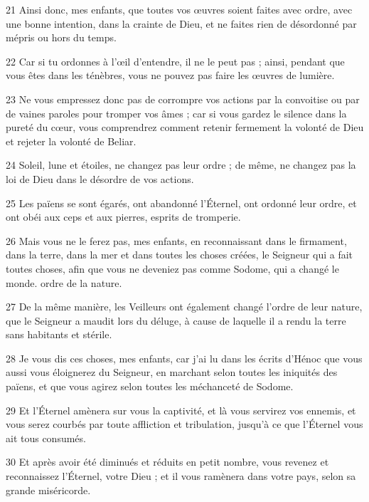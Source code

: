 \par 21 Ainsi donc, mes enfants, que toutes vos œuvres soient faites avec ordre, avec une bonne intention, dans la crainte de Dieu, et ne faites rien de désordonné par mépris ou hors du temps.

\par 22 Car si tu ordonnes à l'œil d'entendre, il ne le peut pas ; ainsi, pendant que vous êtes dans les ténèbres, vous ne pouvez pas faire les œuvres de lumière.

\par 23 Ne vous empressez donc pas de corrompre vos actions par la convoitise ou par de vaines paroles pour tromper vos âmes ; car si vous gardez le silence dans la pureté du cœur, vous comprendrez comment retenir fermement la volonté de Dieu et rejeter la volonté de Beliar.

\par 24 Soleil, lune et étoiles, ne changez pas leur ordre ; de même, ne changez pas la loi de Dieu dans le désordre de vos actions.

\par 25 Les païens se sont égarés, ont abandonné l'Éternel, ont ordonné leur ordre, et ont obéi aux ceps et aux pierres, esprits de tromperie.

\par 26 Mais vous ne le ferez pas, mes enfants, en reconnaissant dans le firmament, dans la terre, dans la mer et dans toutes les choses créées, le Seigneur qui a fait toutes choses, afin que vous ne deveniez pas comme Sodome, qui a changé le monde. ordre de la nature.

\par 27 De la même manière, les Veilleurs ont également changé l'ordre de leur nature, que le Seigneur a maudit lors du déluge, à cause de laquelle il a rendu la terre sans habitants et stérile.

\par 28 Je vous dis ces choses, mes enfants, car j'ai lu dans les écrits d'Hénoc que vous aussi vous éloignerez du Seigneur, en marchant selon toutes les iniquités des païens, et que vous agirez selon toutes les méchanceté de Sodome.

\par 29 Et l'Éternel amènera sur vous la captivité, et là vous servirez vos ennemis, et vous serez courbés par toute affliction et tribulation, jusqu'à ce que l'Éternel vous ait tous consumés.

\par 30 Et après avoir été diminués et réduits en petit nombre, vous revenez et reconnaissez l'Éternel, votre Dieu ; et il vous ramènera dans votre pays, selon sa grande miséricorde.

